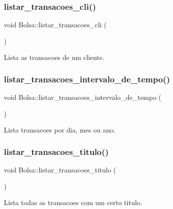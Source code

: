 \subsubsection{\texorpdfstring{listar\+\_\+transacoes\+\_\+cli()}{listar\_transacoes\_cli()}}
{\footnotesize\ttfamily void Bolsa\+::listar\+\_\+transacoes\+\_\+cli (\begin{DoxyParamCaption}{ }\end{DoxyParamCaption})}



Lista as transacoes de um cliente. 

\hypertarget{class_bolsa_acb012fa60aa074fd861168ca3aedadd0}{}\label{class_bolsa_acb012fa60aa074fd861168ca3aedadd0} 
\subsubsection{\texorpdfstring{listar\+\_\+transacoes\+\_\+intervalo\+\_\+de\+\_\+tempo()}{listar\_transacoes\_intervalo\_de\_tempo()}}
{\footnotesize\ttfamily void Bolsa\+::listar\+\_\+transacoes\+\_\+intervalo\+\_\+de\+\_\+tempo (\begin{DoxyParamCaption}{ }\end{DoxyParamCaption})}



Lista transacoes por dia, mes ou ano. 

\hypertarget{class_bolsa_aeac084d57bf9382c83516f1f0c043936}{}\label{class_bolsa_aeac084d57bf9382c83516f1f0c043936} 
\subsubsection{\texorpdfstring{listar\+\_\+transacoes\+\_\+titulo()}{listar\_transacoes\_titulo()}}
{\footnotesize\ttfamily void Bolsa\+::listar\+\_\+transacoes\+\_\+titulo (\begin{DoxyParamCaption}{ }\end{DoxyParamCaption})}



Lista todas as transacoes com um certo titulo. 

